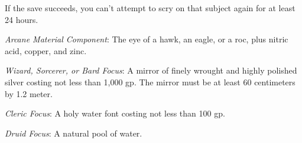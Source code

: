 {	If the save succeeds, you can't attempt to scry on that subject again for at least 24 hours.

	\textit{Arcane Material Component}:
	The eye of a hawk, an eagle, or a roc, plus nitric acid, copper, and zinc.

	\textit{Wizard, Sorcerer, or Bard Focus}:
	A mirror of finely wrought and highly polished silver costing not less than 1,000 gp. The mirror must be at least 60 centimeters by 1.2 meter.

	\textit{Cleric Focus}:
	A holy water font costing not less than 100 gp.

	\textit{Druid Focus}:
	A natural pool of water.

}
